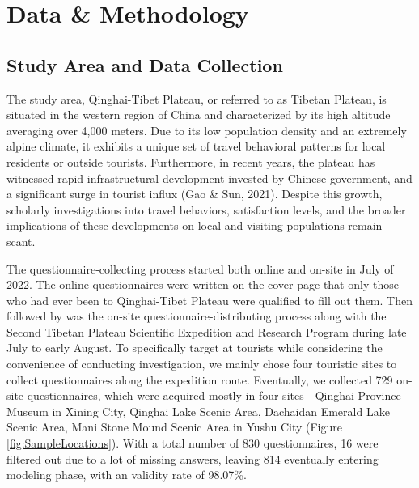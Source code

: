 \documentclass[
11pt, %
oneside, %
english, %
singlespacing, %
]{macthesis} %
\begin{document}
\chapter{Data \& Methodology}\label{rmd-basics}

\section{Study Area and Data Collection}\label{study-area-and-data-collection}

The study area, Qinghai-Tibet Plateau, or referred to as Tibetan Plateau, is situated in the western region of China and characterized by its high altitude averaging over 4,000 meters. Due to its low population density and an extremely alpine climate, it exhibits a unique set of travel behavioral patterns for local residents or outside tourists. Furthermore, in recent years, the plateau has witnessed rapid infrastructural development invested by Chinese government, and a significant surge in tourist influx (Gao \& Sun, 2021). Despite this growth, scholarly investigations into travel behaviors, satisfaction levels, and the broader implications of these developments on local and visiting populations remain scant.

The questionnaire-collecting process started both online and on-site in July of 2022. The online questionnaires were written on the cover page that only those who had ever been to Qinghai-Tibet Plateau were qualified to fill out them. Then followed by was the on-site questionnaire-distributing process along with the Second Tibetan Plateau Scientific Expedition and Research Program during late July to early August. To specifically target at tourists while considering the convenience of conducting investigation, we mainly chose four touristic sites to collect questionnaires along the expedition route. Eventually, we collected 729 on-site questionnaires, which were acquired mostly in four sites - Qinghai Province Museum in Xining City, Qinghai Lake Scenic Area, Dachaidan Emerald Lake Scenic Area, Mani Stone Mound Scenic Area in Yushu City (Figure \ref{fig:SampleLocations}). With a total number of 830 questionnaires, 16 were filtered out due to a lot of missing answers, leaving 814 eventually entering modeling phase, with an validity rate of 98.07\%.
\end{document}
